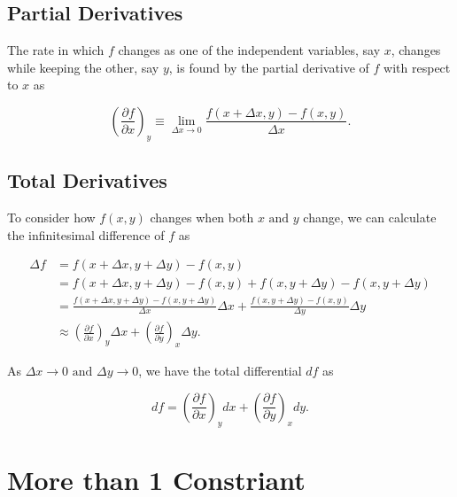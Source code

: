 \documentclass[english,a4paper,12pt]{report}
\begin{document}
\subsection{Partial Derivatives}

The rate in which \(f\) changes as one of the independent variables, say \(x\), changes while keeping the other, say \(y\), is found by the partial derivative of \(f\) with respect to \(x\) as

\begin{equation}
	\left( \frac{\partial f}{\partial x} \right)_{y} \equiv  \lim_{\Delta x \to 0} \frac{f(x+\Delta x,y) - f(x,y)}{\Delta x}.  
\end{equation}

\subsection{Total Derivatives}

To consider how \(f(x,y)\) changes when both \(x \text { and } y\) change, we can calculate the infinitesimal difference of \(f\) as 

\begin{equation} \label{totaldf} 
    \begin{aligned}
        \Delta f &= f(x+\Delta x,y+\Delta y) - f(x,y) \\
        &= f(x+\Delta x,y+\Delta y) - f(x,y) + f(x,y+\Delta y) - f(x,y+\Delta y) \\
        &= \frac{f(x+\Delta x,y+\Delta y)-f(x,y+\Delta y)}{\Delta x}\Delta x + \frac{f(x,y+\Delta y)-f(x,y)}{\Delta y} \Delta y \\
        &\approx \left(\frac{\partial f}{\partial x} \right)_{y} \Delta x + \left(\frac{\partial f}{\partial y}\right)_{x}  \Delta y.
    \end{aligned}
\end{equation}

As \(\Delta x \to 0 \text { and } \Delta y \to 0\), we have the total differential \(df\) as 

\begin{equation}
	df = \left( \frac{\partial f}{\partial x} \right)_{y} dx + \left( \frac{\partial f}{\partial y} \right)_{x} dy.  
\end{equation}


\section{More than 1 Constriant}
\end{document}
